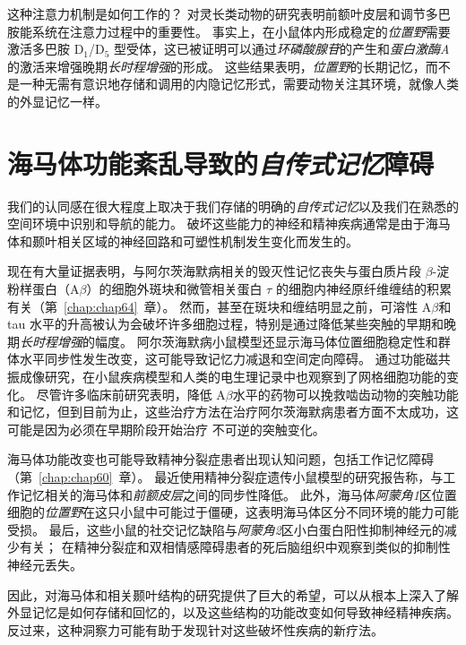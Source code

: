 这种注意力机制是如何工作的？
对灵长类动物的研究表明前额叶皮层和调节多巴胺能系统在注意力过程中的重要性。
事实上，在小鼠体内形成稳定的\textit{位置野}需要激活多巴胺 D$_1$/D$_5$ 型受体，这已被证明可以通过\textit{环磷酸腺苷}的产生和\textit{蛋白激酶A}的激活来增强晚期\textit{长时程增强}的形成。
这些结果表明，\textit{位置野}的长期记忆，而不是一种无需有意识地存储和调用的内隐记忆形式，需要动物关注其环境，就像人类的外显记忆一样。



\section{海马体功能紊乱导致的\textit{自传式记忆}障碍}

我们的认同感在很大程度上取决于我们存储的明确的\textit{自传式记忆}以及我们在熟悉的空间环境中识别和导航的能力。
破坏这些能力的神经和精神疾病通常是由于海马体和颞叶相关区域的神经回路和可塑性机制发生变化而发生的。


现在有大量证据表明，与阿尔茨海默病相关的毁灭性记忆丧失与蛋白质片段 $\beta$-淀粉样蛋白（A$\beta$）的细胞外斑块和微管相关蛋白 $ \tau $ 的细胞内神经原纤维缠结的积累有关（第~\ref{chap:chap64}~章）。
然而，甚至在斑块和缠结明显之前，可溶性 A$\beta$和 tau 水平的升高被认为会破坏许多细胞过程，特别是通过降低某些突触的早期和晚期\textit{长时程增强}的幅度。
阿尔茨海默病小鼠模型还显示海马体位置细胞稳定性和群体水平同步性发生改变，这可能导致记忆力减退和空间定向障碍。
通过功能磁共振成像研究，在小鼠疾病模型和人类的电生理记录中也观察到了网格细胞功能的变化。
尽管许多临床前研究表明，降低 A$\beta$水平的药物可以挽救啮齿动物的突触功能和记忆，但到目前为止，这些治疗方法在治疗阿尔茨海默病患者方面不太成功，这可能是因为必须在早期阶段开始治疗 不可逆的突触变化。


海马体功能改变也可能导致精神分裂症患者出现认知问题，包括工作记忆障碍（第~\ref{chap:chap60}~章）。
最近使用精神分裂症遗传小鼠模型的研究报告称，与工作记忆相关的海马体和\textit{前额皮层}之间的同步性降低。
此外，海马体\textit{阿蒙角1}区位置细胞的\textit{位置野}在这只小鼠中可能过于僵硬，这表明海马体区分不同环境的能力可能受损。
最后，这些小鼠的社交记忆缺陷与\textit{阿蒙角2}区小白蛋白阳性抑制神经元的减少有关；
在精神分裂症和双相情感障碍患者的死后脑组织中观察到类似的抑制性神经元丢失。


因此，对海马体和相关颞叶结构的研究提供了巨大的希望，可以从根本上深入了解外显记忆是如何存储和回忆的，以及这些结构的功能改变如何导致神经精神疾病。
反过来，这种洞察力可能有助于发现针对这些破坏性疾病的新疗法。



